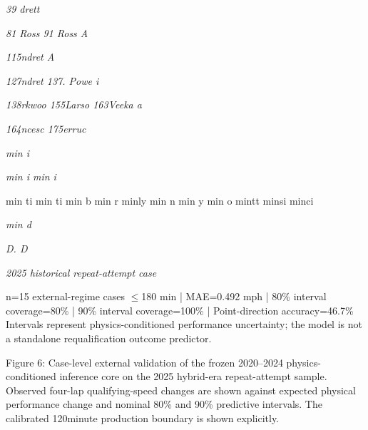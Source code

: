 \begin{center}\textit{39 drett}\end{center}

\begin{center}\textit{81 Ross     91 Ross        A}\end{center}

\begin{center}\textit{115ndret        A}\end{center}

\begin{center}\textit{127ndret                  137. Powe          i}\end{center}

\begin{center}\textit{138rkwoo                  155Larso    163Veeka       a}\end{center}

\begin{center}\textit{164ncesc                              175erruc}\end{center}

\begin{center}\textit{min i}\end{center}

\begin{center}\textit{min i       min i}\end{center}

min ti min ti min b min r minly min n min y min o mintt minsi minci

\begin{center}\textit{min d}\end{center}

\begin{center}\textit{D. D}\end{center}

\begin{center}\textit{2025 historical repeat-attempt case}\end{center}

n=15 external-regime cases \ensuremath{\le}180 min | MAE=0.492 mph | 80\% interval coverage=80\% | 90\% interval coverage=100\% | Point-direction accuracy=46.7\% Intervals represent physics-conditioned performance uncertainty; the model is not a standalone requalification outcome predictor.

Figure 6: Case-level external validation of the frozen 2020--2024 physics-conditioned inference core on the 2025 hybrid-era repeat-attempt sample. Observed four-lap qualifying-speed changes are shown against expected physical performance change and nominal 80\% and 90\% predictive intervals. The calibrated 120minute production boundary is shown explicitly.

